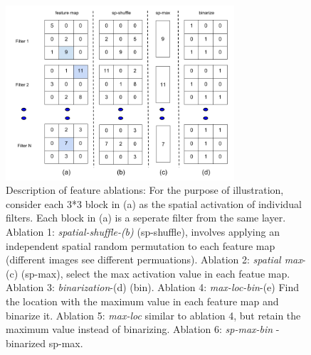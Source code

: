 \documentclass[runningheads]{llncs}
\begin{document}
\begin{figure}[H]
\centering
\includegraphics[height=6.5cm]{images/features1.png}
\caption{Description of feature ablations: For the purpose of illustration, consider each 3*3 block in (a) as the spatial activation of individual filters. Each block in (a) is a seperate filter from the same layer. Ablation 1: \textit{spatial-shuffle-(b)} (sp-shuffle), involves applying an independent spatial random permutation to each feature map (different images see different permuations). Ablation 2: \textit{spatial max}-(c) (sp-max), select the max activation value in each featue map. Ablation 3: \textit{binarization}-(d) (bin). Ablation 4: \textit{max-loc-bin}-(e) Find the location with the maximum value in each feature map and binarize it. Ablation 5: \textit{max-loc} similar to ablation 4, but retain the maximum value instead of binarizing. Ablation 6: \textit{sp-max-bin} - binarized sp-max.}
\label{fig:features}
\end{figure}
\end{document}
